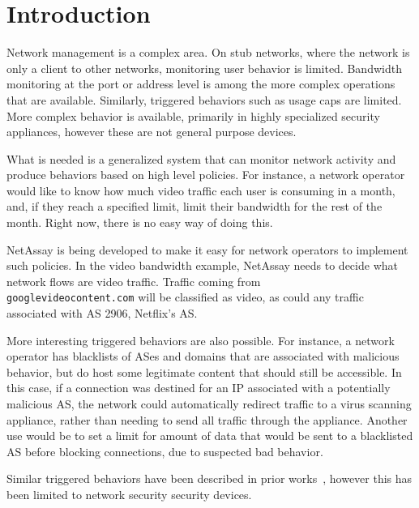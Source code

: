 \documentclass{sig-alternate}
\newcommand\tti[1]{\small\texttt{#1}\normalsize}
\newcommand\system{NetAssay}
\begin{document}



\section{Introduction}
Network management is a complex area. On stub networks, where the network is only a client to other networks, monitoring user behavior is limited. Bandwidth monitoring at the port or address level is among the more complex operations that are available. Similarly, triggered behaviors such as usage caps are limited. 
More complex behavior is available, primarily in highly specialized security appliances, however these are not general purpose devices.

What is needed is a generalized system that can monitor network activity and produce behaviors based on high level policies. For instance, a network operator would like to know how much video traffic each user is consuming in a month, and, if they reach a specified limit, limit their bandwidth for the rest of the month. Right now, there is no easy way of doing this. 

\system{} is being developed to make it easy for network operators to implement such policies. In the video bandwidth example, \system{} needs to decide what network flows are video traffic. Traffic coming from \\\tti{googlevideocontent.com} will be classified as video, as could any traffic associated with AS 2906, Netflix's AS.

More interesting triggered behaviors are also possible. For instance, a network operator has blacklists of ASes and domains that are associated with malicious behavior, but do host some legitimate content that should still be accessible. In this case, if a connection was destined for an IP associated with a potentially malicious AS, the network could automatically redirect traffic to a virus scanning appliance, rather than needing to send all traffic through the appliance. Another use would be to set a limit for amount of data that would be sent to a blacklisted AS before blocking connections, due to suspected bad behavior.

Similar triggered behaviors have been described in prior works~\cite{cloudwatcher}\cite{opensafe}, however this has been limited to network security security devices.
\end{document}
